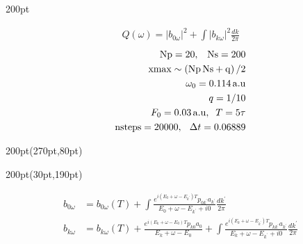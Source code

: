 \begin{frame}
\begin{textblock*}{200pt}
{\begin{minipage}{\linewidth}
{\footnotesize
\begin{align}
  Q(\omega) = \left| b_{0\omega}\right|^2
        + \int \left| b_{k\omega}\right|^2 \frac{dk}{2\pi} \nonumber
\end{align}
        \begin{align}
                \rm{Np} = 20,\;\;\;\rm{Ns} = 200 \nonumber\\
                \rm{xmax} \sim \left(\rm{Np\,Ns}+q\right)/2 \nonumber\\
                \omega_0 = 0.114\,{\rm a.u}\nonumber\\
                q=1/10\nonumber\\
                F_0 = 0.03\,{\rm a.u}, \;\;T=5\tau\nonumber\\
                {\rm nsteps} = 20 000,\, \;\;\Delta t=0.06889\nonumber
        \end{align}

}
\end{minipage}
}
\end{textblock*}



\begin{textblock*}{200pt}(270pt,80pt)
\end{textblock*}



\begin{textblock*}{200pt}(30pt,190pt)
\footnotesize

\begin{align}
b_{0\omega} & = b_{0\omega}(T)
 +\int\frac{e^{i(E_0+\omega-E_{k^\prime})T}p_{0k^\prime}a_{k^\prime}}
{E_0+\omega-E_{k^\prime} + i0} \frac{dk^\prime}{2\pi} \nonumber\\
b_{k\omega} & = b_{k\omega}(T)
 +\frac{e^{i(E_k+\omega-E_0)T}p_{k0}a_0}{E_k+\omega-E_0}
 +\int\frac{e^{i(E_k+\omega-E_{k^\prime})T}p_{kk^\prime}a_{k^\prime}}
{E_k+\omega-E_{k^\prime} + i0} \frac{dk^\prime}{2\pi} \nonumber
\end{align}


\end{textblock*}
\end{frame}

